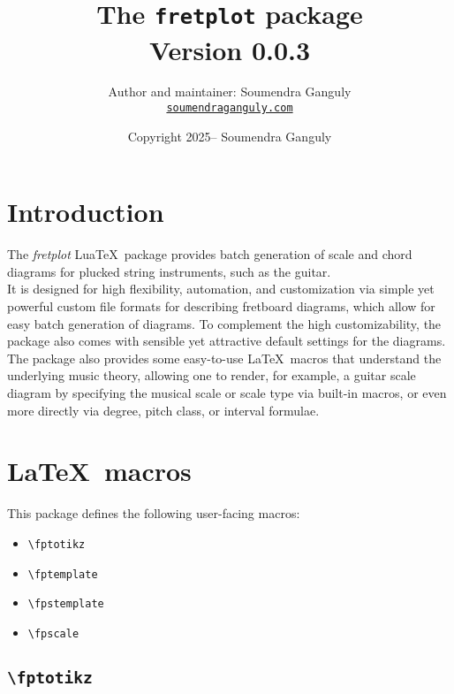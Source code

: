 \documentclass[12pt,letterpaper]{article}
\title{The \texttt{fretplot} package\\\large Version 0.0.3}
\author{Author and maintainer: Soumendra Ganguly\\\href{https://soumendraganguly.com}{\texttt{soumendraganguly.com}}}
\date{Copyright 2025-- Soumendra Ganguly}
\begin{document}
\maketitle
\thispagestyle{empty}
\tableofcontents

\newpage

\section{Introduction}

The \textit{fretplot} Lua\TeX\ package provides batch generation of scale and chord diagrams for plucked string instruments, such as the guitar.\\

It is designed for high flexibility, automation, and customization via simple yet powerful custom file formats for describing fretboard diagrams, which allow for easy batch generation of diagrams. To complement the high customizability, the package also comes with sensible yet attractive default settings for the diagrams.\\

The package also provides some easy-to-use \LaTeX\ macros that understand the underlying music theory, allowing one to render, for example, a guitar scale diagram by specifying the musical scale or scale type via built-in macros, or even more directly via degree, pitch class, or interval formulae.

\newpage

\section{\LaTeX\ macros}

This package defines the following user-facing macros:

\begin{itemize}
  \item \verb|\fptotikz|
  \item \verb|\fptemplate|
  \item \verb|\fpstemplate|
  \item \verb|\fpscale|
\end{itemize}

\subsection{\texttt{\textbackslash fptotikz}}
\end{document}
